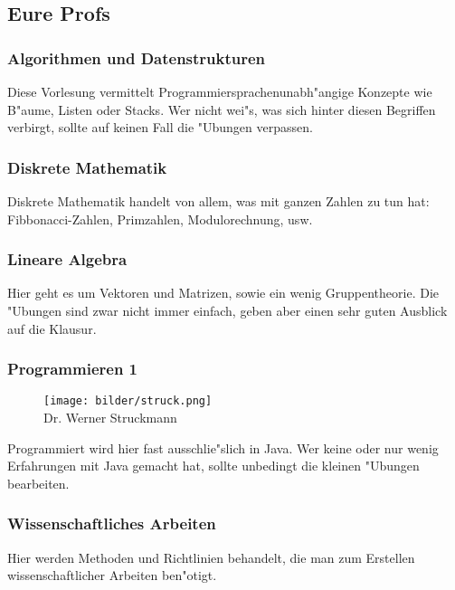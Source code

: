 \subsection{Eure Profs}

\subsubsection{Algorithmen und Datenstrukturen}

Diese Vorlesung vermittelt Programmiersprachenunabh"angige Konzepte wie B"aume, Listen oder Stacks. Wer nicht wei"s, was sich hinter diesen Begriffen verbirgt, sollte auf keinen Fall die "Ubungen verpassen.


\subsubsection{Diskrete Mathematik}

Diskrete Mathematik handelt von allem, was mit ganzen Zahlen zu tun hat: Fibbonacci-Zahlen, Primzahlen, Modulorechnung, usw.


\subsubsection{Lineare Algebra}

Hier geht es um Vektoren und Matrizen, sowie ein wenig Gruppentheorie. Die
"Ubungen sind zwar nicht immer einfach, geben aber einen sehr guten Ausblick auf die Klausur.


\subsubsection{Programmieren 1}

\begin{figure}[h]
	\centering\texttt{[image: bilder/struck.png]}\\
	{Dr. Werner Struckmann}
\end{figure}
Programmiert wird hier fast ausschlie"slich in Java. Wer keine oder nur wenig Erfahrungen mit Java gemacht hat, sollte unbedingt die kleinen "Ubungen bearbeiten.


\subsubsection{Wissenschaftliches Arbeiten}

Hier werden Methoden und Richtlinien behandelt, die man zum Erstellen
wissenschaftlicher Arbeiten ben"otigt.
